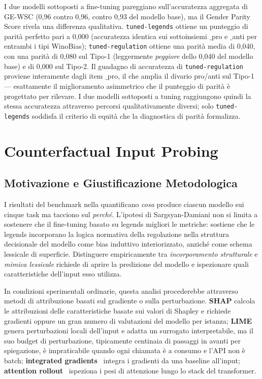 \documentclass[pdflatex, sn-apa]{sn-jnl}%
\theoremstyle{thmstyleone}%
\theoremstyle{thmstyletwo}%
\theoremstyle{thmstylethree}%
\newcommand{\modellegends}{\texttt{tuned-legends}}
\newcommand{\modelreg}{\texttt{tuned-regulation}}
\begin{document}
I due modelli sottoposti a fine-tuning pareggiano sull'accuratezza aggregata di
GE-WSC (0,96 contro 0,96, contro 0,93 del modello base), ma il Gender Parity
Score rivela una differenza qualitativa. \modellegends{} ottiene un punteggio di
parità perfetto pari a 0,000 (accuratezza identica sui sottoinsiemi $\_$pro e
$\_$anti per entrambi i tipi WinoBias); \modelreg{} ottiene una parità media di
0,040, con una parità di 0,080 sul Tipo-1 (leggermente \emph{peggiore} dello 0,040
del modello base) e di 0,000 sul Tipo-2. Il guadagno di accuratezza di \modelreg{}
proviene interamente dagli item $\_$pro, il che amplia il divario pro/anti sul
Tipo-1 --- esattamente il miglioramento asimmetrico che il punteggio di parità è
progettato per rilevare. I due modelli sottoposti a tuning raggiungono quindi la
stessa accuratezza attraverso percorsi qualitativamente diversi; solo
\modellegends{} soddisfa il criterio di equità che la diagnostica di parità
formalizza.

\FloatBarrier

\section{Counterfactual Input Probing}
\label{sec:cip}

\subsection{Motivazione e Giustificazione Metodologica}
\label{sec:cip:motivation}

I risultati del benchmark nella  quantificano \emph{cosa}
produce ciascun modello sui cinque task ma tacciono sul \emph{perché}. L'ipotesi
di Sargsyan-Damiani non si limita a sostenere che il fine-tuning basato su legends
migliori le metriche: sostiene che le legends incorporano la logica normativa
della regolazione nella struttura decisionale del modello come bias induttivo
interiorizzato, anziché come schema lessicale di superficie. Distinguere
empiricamente tra \emph{incorporamento strutturale} e \emph{mimica lessicale}
richiede di aprire la predizione del modello e ispezionare quali caratteristiche
dell'input esso utilizza.

In condizioni sperimentali ordinarie, questa analisi procederebbe attraverso
metodi di attribuzione basati sul gradiente o sulla perturbazione. \textbf{SHAP}
\citep{lundberg2017shap} calcola le attribuzioni delle caratteristiche basate sui
valori di Shapley e richiede gradienti oppure un gran numero di valutazioni del
modello per istanza; \textbf{LIME} \citep{ribeiro2016lime} genera perturbazioni
locali dell'input e adatta un surrogato interpretabile, ma il suo budget di
perturbazione, tipicamente centinaia di passaggi in avanti per spiegazione, è
impraticabile quando ogni chiamata è a consumo e l'API non è batch;
\textbf{integrated gradients}~\citep{sundararajan2017ig} integra i gradienti da
una baseline all'input; \textbf{attention rollout}~\citep{abnar2020rollout}
ispeziona i pesi di attenzione lungo lo stack del transformer.
\end{document}
